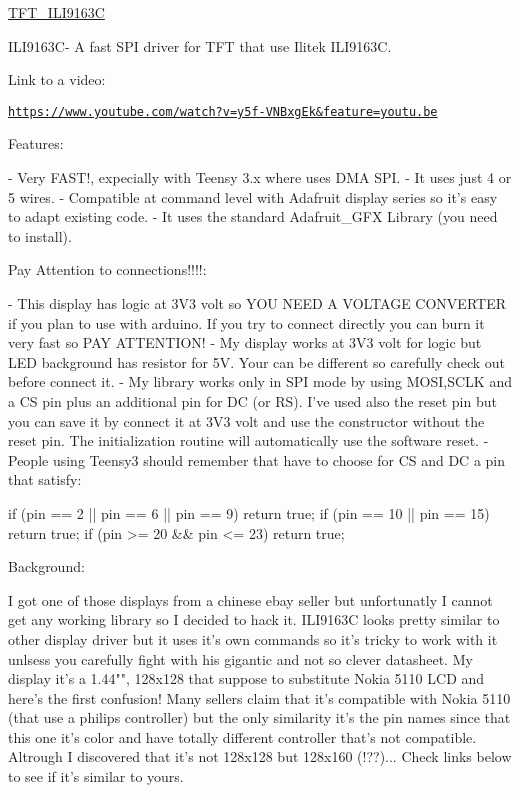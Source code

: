 \hyperlink{class_t_f_t___i_l_i9163_c}{T\+F\+T\+\_\+\+I\+L\+I9163\+C}

I\+L\+I9163\+C-\/ A fast S\+P\+I driver for T\+F\+T that use Ilitek I\+L\+I9163\+C.

 \begin{DoxyVerb}Link to a video:
\end{DoxyVerb}


\href{https://www.youtube.com/watch?v=y5f-VNBxgEk&feature=youtu.be}{\tt https\+://www.\+youtube.\+com/watch?v=y5f-\/\+V\+N\+Bxg\+Ek\&feature=youtu.\+be} 



Features\+: \begin{DoxyVerb}- Very FAST!, expecially with Teensy 3.x where uses DMA SPI.
- It uses just 4 or 5 wires.
- Compatible at command level with Adafruit display series so it's easy to adapt existing code.
- It uses the standard Adafruit_GFX Library (you need to install). 
\end{DoxyVerb}


Pay Attention to connections!!!!\+: \begin{DoxyVerb}- This display has logic at 3V3 volt so YOU NEED A VOLTAGE CONVERTER if you plan to use with arduino.
If you try to connect directly you can burn it very fast so PAY ATTENTION!
- My display works at 3V3 volt for logic but LED background has resistor for 5V. Your can be different
so carefully check out before connect it.
- My library works only in SPI mode by using MOSI,SCLK and a CS pin plus an additional pin for DC (or RS).
I've used also the reset pin but you can save it by connect it at 3V3 volt and use the constructor without
the reset pin. The initialization routine will automatically use the software reset.
- People using Teensy3 should remember that have to choose for CS and DC a pin that satisfy:

if (pin == 2 || pin == 6 || pin == 9) return true;
if (pin == 10 || pin == 15) return true;
if (pin >= 20 && pin <= 23) return true;
\end{DoxyVerb}


Background\+: \begin{DoxyVerb}I got one of those displays from a chinese ebay seller but unfortunatly I cannot get
any working library so I decided to hack it. ILI9163C looks pretty similar to other 
display driver but it uses it's own commands so it's tricky to work with it unlsess you
carefully fight with his gigantic and not so clever datasheet.
My display it's a 1.44"", 128x128 that suppose to substitute Nokia 5110 LCD and here's the 
first confusion! Many sellers claim that it's compatible with Nokia 5110 (that use a philips
controller) but the only similarity it's the pin names since that this one it's color and
have totally different controller that's not compatible. Altrough I discovered that it's not
128x128 but 128x160 (!??)... Check links below to see if it's similar to yours.
\end{DoxyVerb}



